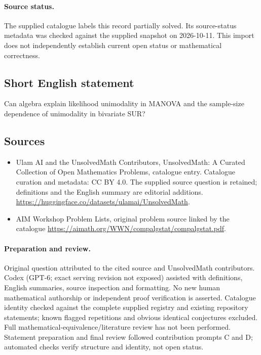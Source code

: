 \documentclass[11pt]{article}
\begin{document}
\paragraph{Source status.}
The supplied catalogue labels this record partially solved. Its source-status metadata was checked against the supplied snapshot on 2026-10-11. This import does not independently establish current open status or mathematical correctness.
\subsection{Short English statement}
Can algebra explain likelihood unimodality in MANOVA and the sample-size dependence of unimodality in bivariate SUR?
\subsection{Sources}
\begin{itemize}
\item[\hypertarget{source:statement:1}{S1}] Ulam AI and the UnsolvedMath Contributors, UnsolvedMath: A Curated Collection of Open Mathematics Problems, catalogue entry. Catalogue curation and metadata: CC BY 4.0. The supplied source question is retained; definitions and the English summary are editorial additions.
\url{https://huggingface.co/datasets/ulamai/UnsolvedMath}.
\item[\hypertarget{source:statement:2}{S2}] AIM Workshop Problem Lists, original problem source linked by the catalogue
\url{https://aimath.org/WWN/compalgstat/compalgstat.pdf}.
\end{itemize}
\paragraph{Preparation and review.}
Original question attributed to the cited source and UnsolvedMath contributors. Codex (GPT-6; exact serving revision not exposed) assisted with definitions, English summaries, source inspection and formatting. No new human mathematical authorship or independent proof verification is asserted. Catalogue identity checked against the complete supplied registry and existing repository statements; known flagged repetitions and obvious identical conjectures excluded. Full mathematical-equivalence/literature review has not been performed. Statement preparation and final review followed contribution prompts C and D; automated checks verify structure and identity, not open status.
\label{end:statement}
\end{document}
